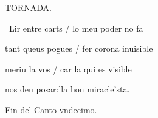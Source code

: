 \documentclass[12pt]{article}
\begin{document}
\begin{estrofaExtra}%




\begin{tornada}

TORNADA.

\end{tornada}


\end{estrofaExtra}


\begin{estrofa}

 \textparagraph\  Lir entre carts / lo meu poder no fa

 tant queus pogues / fer corona inuisible

 meriu  la vos / car la qui es visible

 nos deu posar:lla hon miracle'sta.

\end{estrofa}



\begin{estrofaExtra}%

\begin{final}

Fin del Canto vndecimo.

\end{final}

\end{estrofaExtra}
\end{document}
